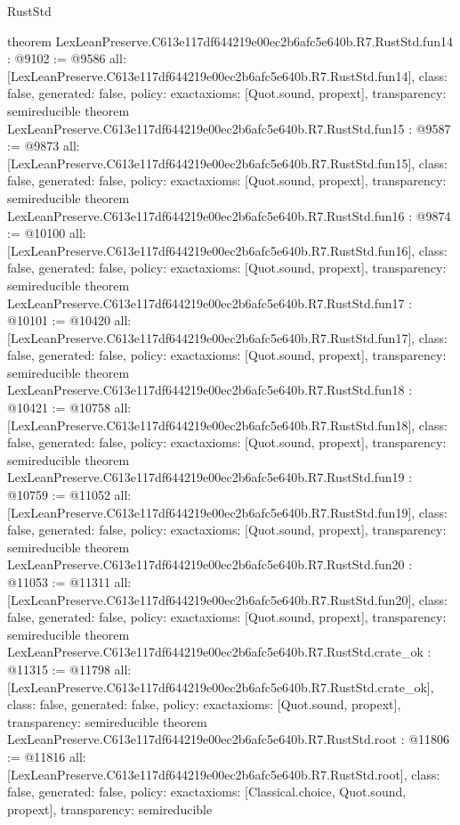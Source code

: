 \begin{lexlean}{RustStd}
\begin{coremodule}
{}
theorem LexLeanPreserve.C613e117df644219e00ec2b6afc5e640b.R7.RustStd.fun14 : @9102 := @9586 {
  all: [LexLeanPreserve.C613e117df644219e00ec2b6afc5e640b.R7.RustStd.fun14],
  class: false,
  generated: false,
  policy: exact{axioms: [Quot.sound, propext]},
  transparency: semireducible
}
theorem LexLeanPreserve.C613e117df644219e00ec2b6afc5e640b.R7.RustStd.fun15 : @9587 := @9873 {
  all: [LexLeanPreserve.C613e117df644219e00ec2b6afc5e640b.R7.RustStd.fun15],
  class: false,
  generated: false,
  policy: exact{axioms: [Quot.sound, propext]},
  transparency: semireducible
}
theorem LexLeanPreserve.C613e117df644219e00ec2b6afc5e640b.R7.RustStd.fun16 : @9874 := @10100 {
  all: [LexLeanPreserve.C613e117df644219e00ec2b6afc5e640b.R7.RustStd.fun16],
  class: false,
  generated: false,
  policy: exact{axioms: [Quot.sound, propext]},
  transparency: semireducible
}
theorem LexLeanPreserve.C613e117df644219e00ec2b6afc5e640b.R7.RustStd.fun17 : @10101 := @10420 {
  all: [LexLeanPreserve.C613e117df644219e00ec2b6afc5e640b.R7.RustStd.fun17],
  class: false,
  generated: false,
  policy: exact{axioms: [Quot.sound, propext]},
  transparency: semireducible
}
theorem LexLeanPreserve.C613e117df644219e00ec2b6afc5e640b.R7.RustStd.fun18 : @10421 := @10758 {
  all: [LexLeanPreserve.C613e117df644219e00ec2b6afc5e640b.R7.RustStd.fun18],
  class: false,
  generated: false,
  policy: exact{axioms: [Quot.sound, propext]},
  transparency: semireducible
}
theorem LexLeanPreserve.C613e117df644219e00ec2b6afc5e640b.R7.RustStd.fun19 : @10759 := @11052 {
  all: [LexLeanPreserve.C613e117df644219e00ec2b6afc5e640b.R7.RustStd.fun19],
  class: false,
  generated: false,
  policy: exact{axioms: [Quot.sound, propext]},
  transparency: semireducible
}
theorem LexLeanPreserve.C613e117df644219e00ec2b6afc5e640b.R7.RustStd.fun20 : @11053 := @11311 {
  all: [LexLeanPreserve.C613e117df644219e00ec2b6afc5e640b.R7.RustStd.fun20],
  class: false,
  generated: false,
  policy: exact{axioms: [Quot.sound, propext]},
  transparency: semireducible
}
theorem LexLeanPreserve.C613e117df644219e00ec2b6afc5e640b.R7.RustStd.crate_ok : @11315 := @11798 {
  all: [LexLeanPreserve.C613e117df644219e00ec2b6afc5e640b.R7.RustStd.crate_ok],
  class: false,
  generated: false,
  policy: exact{axioms: [Quot.sound, propext]},
  transparency: semireducible
}
theorem LexLeanPreserve.C613e117df644219e00ec2b6afc5e640b.R7.RustStd.root : @11806 := @11816 {
  all: [LexLeanPreserve.C613e117df644219e00ec2b6afc5e640b.R7.RustStd.root],
  class: false,
  generated: false,
  policy: exact{axioms: [Classical.choice, Quot.sound, propext]},
  transparency: semireducible
}


\end{coremodule}
\end{lexlean}
